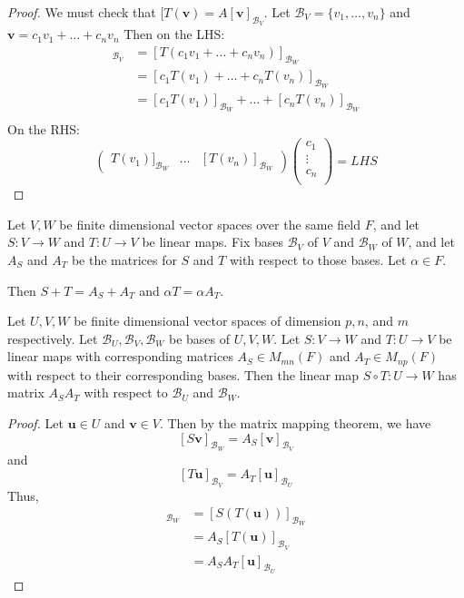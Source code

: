 \documentclass{article}
\begin{document}
\begin{proof}
  We must check that $[T(\textbf{v}) = A[\textbf{v}]_{\mathcal{B}_V}$. Let $\mathcal{B}_V = \{v_1, \ldots, v_n\}$ and $\textbf{v} = c_1v_1 + \dots + c_nv_n$
  Then on the LHS:
  \begin{align*}
    [T(v)]_{\mathcal{B}_V} & = [T(c_1v_1+ \dots + c_nv_n)]_{\mathcal{B}_W}                       \\
                           & = [c_1T(v_1) + \dots + c_nT(v_n)]_{\mathcal{B}_W}                   \\
                           & = [c_1T(v_1)]_{\mathcal{B}_W} + \dots + [c_nT(v_n)]_{\mathcal{B}_W} \\
  \end{align*}
  On the RHS:
  \begin{equation*}
    \begin{pmatrix}
      T(v_1)]_{\mathcal{B}_W} & \dots & [T(v_n)]_{\mathcal{B}_W}
    \end{pmatrix}
    \begin{pmatrix}
      c_1 \\\vdots\\c_n\\
    \end{pmatrix} = LHS
  \end{equation*}
\end{proof}
\begin{theorem}
  Let $V, W$ be finite dimensional vector spaces over the same field $F$, and let $S : V \to W$ and $T: U \to V$ be linear maps. Fix bases $\mathcal{B}_V$ of $V$ and $\mathcal{B}_W$ of $W$, and let $A_S$ and $A_T$ be the matrices for $S$ and $T$ with respect to those bases. Let $\alpha \in F$.

  Then $S + T = A_S + A_T$ and $\alpha T = \alpha A_T$.
\end{theorem}
\begin{theorem}
  Let $U, V, W$ be finite dimensional vector spaces of dimension $p, n$, and $m$ respectively. Let $\mathcal{B}_U, \mathcal{B}_V, \mathcal{B}_W$ be bases of $U, V, W$. Let $S : V \to W$ and $T: U \to V$ be linear maps with corresponding matrices $A_S \in M_{mn}(F)$ and $A_T \in M_{np}(F)$ with respect to their corresponding bases. Then the linear map $S \circ T: U \to W$ has matrix $A_SA_T$ with respect to $\mathcal{B}_U$ and $\mathcal{B}_W$.
\end{theorem}
\begin{proof}
  Let $\textbf{u} \in U$ and $\textbf{v} \in V$. Then by the matrix mapping theorem, we have \[
    [S\textbf{v}]_{\mathcal{B}_W} = A_S[\textbf{v}]_{\mathcal{B}_V}
  \]
  and \[
    [T\textbf{u}]_{\mathcal{B}_V} = A_T[\textbf{u}]_{\mathcal{B}_U}
  \]
  Thus,
  \begin{align*}
    [(ST)(\textbf{u})]_{\mathcal{B}_W} & = [S(T(\textbf{u}))]_{\mathcal{B}_W} \\
                                       & = A_S[T(\textbf{u})]_{\mathcal{B}_V} \\
                                       & = A_SA_T[\textbf{u}]_{\mathcal{B}_U}
  \end{align*}
\end{proof}
\end{document}
